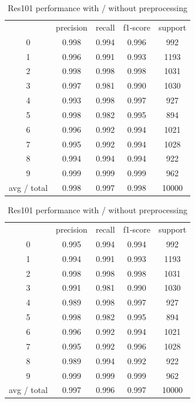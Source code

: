 \documentclass{article}
\begin{document}
 
\begin{table}[!htb]
	\centering
	\small 
	\caption{Res101 performance with / without preprocessing}
		\begin{tabular}{ccccc}
			& precision & recall & f1-score & support \\
			0     & 0.998  & 0.994  & 0.996  & 992 \\
			1     & 0.996  & 0.991  & 0.993  & 1193 \\
			2     & 0.998  & 0.998 & 0.998  & 1031 \\
			3     & 0.997  & 0.981  & 0.990  & 1030 \\
			4     & 0.993  & 0.998  & 0.997  & 927 \\
			5     & 0.998  & 0.982  & 0.995  & 894 \\
			6     & 0.996  & 0.992  & 0.994  & 1021 \\
			7     & 0.995  & 0.992  & 0.994  & 1028 \\
			8     & 0.994  & 0.994  & 0.994  & 922 \\
			9     & 0.999  & 0.999  & 0.999  & 962 \\
			avg / total & 0.998  & 0.997  & 0.998  & 10000 \\
		\end{tabular}%
		\begin{tabular}{ccccc}
			& precision & recall & f1-score & support \\
			0     & 0.995  & 0.994  & 0.994  & 992 \\
			1     & 0.994  & 0.991  & 0.993  & 1193 \\
			2     & 0.998  & 0.998 & 0.998  & 1031 \\
			3     & 0.991  & 0.981  & 0.990  & 1030 \\
			4     & 0.989  & 0.998  & 0.997  & 927 \\
			5     & 0.998  & 0.982  & 0.995  & 894 \\
			6     & 0.996  & 0.992  & 0.994  & 1021 \\
			7     & 0.995  & 0.992  & 0.996  & 1028 \\
			8     & 0.989  & 0.994  & 0.992  & 922 \\
			9     & 0.999  & 0.999  & 0.999  & 962 \\
			avg / total & 0.997  & 0.996  & 0.997  & 10000 \\
		\end{tabular}%
	
	\label{tbl:resnet_with_score}%
\end{table}%
\end{document}
